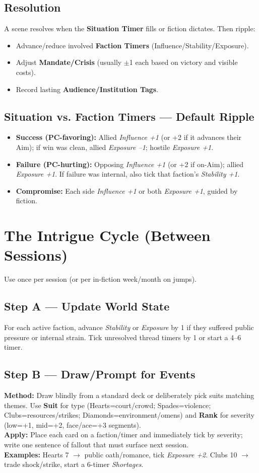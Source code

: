 \documentclass[11pt]{article}
\begin{document}
\subsection{Resolution}
A scene resolves when the \textbf{Situation Timer } fills or fiction dictates. Then ripple:
\begin{itemize}
  \item Advance/reduce involved \textbf{Faction Timers} (Influence/Stability/Exposure).
  \item Adjust \textbf{Mandate/Crisis} (usually $\pm$1 each based on victory and visible costs).
  \item Record lasting \textbf{Audience/Institution Tags}.
\end{itemize}

\subsection{Situation vs. Faction Timers --- Default Ripple}
\begin{itemize}
  \item \textbf{Success (PC-favoring):} Allied \emph{Influence +1} (or +2 if it advances their Aim); if win was clean, allied \emph{Exposure --1}; hostile \emph{Exposure +1}.
  \item \textbf{Failure (PC-hurting):} Opposing \emph{Influence +1} (or +2 if on-Aim); allied \emph{Exposure +1}. If failure was internal, also tick that faction's \emph{Stability +1}.
  \item \textbf{Compromise:} Each side \emph{Influence +1} or both \emph{Exposure +1}, guided by fiction.
\end{itemize}

\section{The Intrigue Cycle (Between Sessions)}
Use once per session (or per in-fiction week/month on jumps).
\subsection*{Step A --- Update World State}
For each active faction, advance \emph{Stability} or \emph{Exposure} by 1 if they suffered public pressure or internal strain. Tick unresolved thread timers by 1 or start a 4--6 timer.

\subsection*{Step B --- Draw/Prompt for Events}
\textbf{Method:} Draw blindly from a standard deck or deliberately pick suits matching themes. Use \textbf{Suit} for type (Hearts=court/crowd; Spades=violence; Clubs=resources/strikes; Diamonds=environment/omens) and \textbf{Rank} for severity (low=+1, mid=+2, face/ace=+3 segments).\\
\textbf{Apply:} Place each card on a faction/timer and immediately tick by severity; write one sentence of fallout that must surface next session.\\
\textbf{Examples:} Hearts 7 $\to$ public oath/romance, tick \emph{Exposure +2}. Clubs 10 $\to$ trade shock/strike, start a 6-timer \emph{Shortages}.
\end{document}
